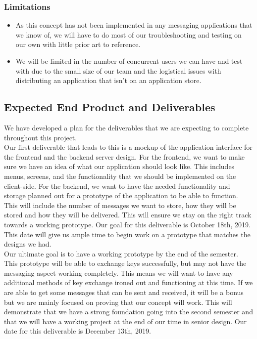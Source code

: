 \documentclass[11pt]{article}
\begin{document}
\subsubsection*{Limitations}
\begin{itemize}
	\item{As this concept has not been implemented in any messaging applications that we know of, we will have to do most of our troubleshooting and testing on our own with little prior art to reference.}
	\item{We will be limited in the number of concurrent users we can have and test with due to the small size of our team and the logistical issues with distributing an application that isn’t on an application store.}
\end{itemize}

\subsection{Expected End Product and Deliverables}
We have developed a plan for the deliverables that we are expecting to complete throughout this project. \\

Our first deliverable that leads to this is a mockup of the application interface for the frontend and the backend server design. For the frontend, we want to make sure we have an idea of what our application should look like. This includes menus, screens, and the functionality that we should be implemented on the client-side. For the backend, we want to have the needed functionality and storage planned out for a prototype of the application to be able to function. This will include the number of messages we want to store, how they will be stored and how they will be delivered. This will ensure we stay on the right track towards a working prototype. Our goal for this deliverable is October 18th, 2019. This date will give us ample time to begin work on a prototype that matches the designs we had.\\

Our ultimate goal is to have a working prototype by the end of the semester. This prototype will be able to exchange keys successfully, but may not have the messaging aspect working completely. This means we will want to have any additional methods of key exchange ironed out and functioning at this time. If we are able to get some messages that can be sent and received, it will be a bonus but we are mainly focused on proving that our concept will work. This will demonstrate that we have a strong foundation going into the second semester and that we will have a working project at the end of our time in senior design. Our date for this deliverable is December 13th, 2019.\\
\end{document}
